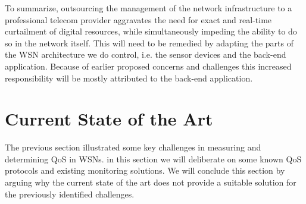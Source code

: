 To summarize, outsourcing the management of the network infrastructure to a professional telecom provider aggravates the need for exact and real-time curtailment of digital resources, while simultaneously impeding the ability to do so in the network itself. This will need to be remedied by adapting the parts of the WSN architecture we do control, i.e. the sensor devices and the back-end application. Because of earlier proposed concerns and challenges this increased responsibility will be mostly attributed to the back-end application.



\section{Current State of the Art}
The previous section illustrated some key challenges in measuring and determining QoS in WSNs. in this section we will deliberate on some known QoS protocols and existing monitoring solutions. We will conclude this section by arguing why the current state of the art does not provide a suitable solution for the previously identified challenges.

